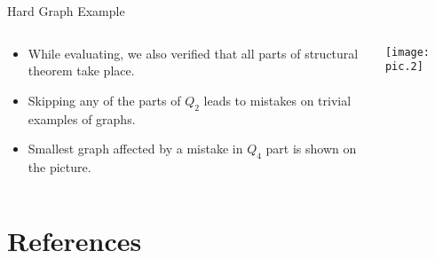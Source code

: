 \documentclass{beamer}
\begin{document}
\begin{frame}{Hard Graph Example}
    \begin{columns}
        \begin{column}{0.7\textwidth}
            \begin{itemize}
                \item While evaluating, we also verified that all parts of structural theorem take place. 
                \item Skipping any of the parts of $Q_2$ leads to mistakes on trivial examples of graphs.
                \item Smallest graph affected by a mistake in $Q_4$ part is shown on the picture.
            \end{itemize}
        \end{column}
        \begin{column}{0.3\textwidth}
            \texttt{[image: pic.2]}
        \end{column}
    \end{columns}
\end{frame}

\section{References}

\begin{frame}[allowframebreaks]
    {}
    
\end{frame}
\end{document}
